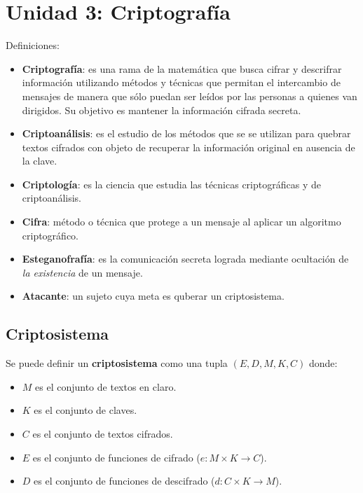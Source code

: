 \section{Unidad 3: Criptografía}
Definiciones:
\begin{itemize}
	\item \textbf{Criptografía}: es una rama de la matemática que busca cifrar y descrifrar información utilizando métodos y técnicas que permitan el intercambio de mensajes de manera que sólo puedan ser leídos por las personas a quienes van dirigidos. Su objetivo es mantener la información cifrada secreta.
	\item \textbf{Criptoanálisis}: es el estudio de los métodos que se se utilizan para quebrar textos cifrados con objeto de recuperar la información original en ausencia de la clave.
	\item \textbf{Criptología}: es la ciencia que estudia las técnicas criptográficas y de criptoanálisis.
	\item \textbf{Cifra}: método o técnica que protege a un mensaje al aplicar un algoritmo criptográfico.
	\item \textbf{Esteganofrafía}: es la comunicación secreta lograda mediante ocultación de \emph{la existencia} de un mensaje.
	\item \textbf{Atacante}: un sujeto cuya meta es quberar un criptosistema.
\end{itemize}

\subsection{Criptosistema}
Se puede definir un \textbf{criptosistema} como una tupla $(E, D, M, K, C)$ donde:
\begin{itemize}
	\item $M$ es el conjunto de textos en claro.
	\item $K$ es el conjunto de claves.
	\item $C$ es el conjunto de textos cifrados.
	\item $E$ es el conjunto de funciones de cifrado ($e:M\times K \rightarrow C$).
	\item $D$ es el conjunto de funciones de descifrado ($d:C\times K \rightarrow M$).
\end{itemize}

